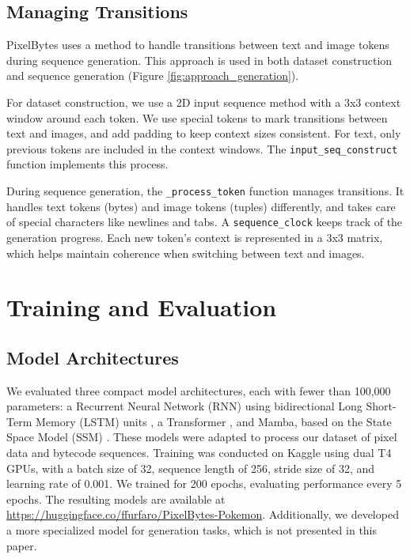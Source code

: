 \documentclass[10pt,a4paper]{article}
\begin{document}
\subsection{Managing Transitions}

PixelBytes uses a method to handle transitions between text and image tokens during sequence generation. This approach is used in both dataset construction and sequence generation (Figure \ref{fig:approach_generation}).

For dataset construction, we use a 2D input sequence method with a 3x3 context window around each token. We use special tokens to mark transitions between text and images, and add padding to keep context sizes consistent. For text, only previous tokens are included in the context windows. The \texttt{input\_seq\_construct} function implements this process.

During sequence generation, the \texttt{\_process\_token} function manages transitions. It handles text tokens (bytes) and image tokens (tuples) differently, and takes care of special characters like newlines and tabs. A \texttt{sequence\_clock} keeps track of the generation progress. Each new token's context is represented in a 3x3 matrix, which helps maintain coherence when switching between text and images.

\section{Training and Evaluation}

\subsection{Model Architectures}
We evaluated three compact model architectures, each with fewer than 100,000 parameters: a Recurrent Neural Network (RNN) using bidirectional Long Short-Term Memory (LSTM) units \cite{schmidhuber1997long}, a Transformer \cite{vaswani2017attention}, and Mamba, based on the State Space Model (SSM) \cite{dao2024transformers}. These models were adapted to process our dataset of pixel data and bytecode sequences. Training was conducted on Kaggle using dual T4 GPUs, with a batch size of 32, sequence length of 256, stride size of 32, and learning rate of 0.001. We trained for 200 epochs, evaluating performance every 5 epochs. The resulting models are available at \url{https://huggingface.co/ffurfaro/PixelBytes-Pokemon}. Additionally, we developed a more specialized model for generation tasks, which is not presented in this paper.
\end{document}

